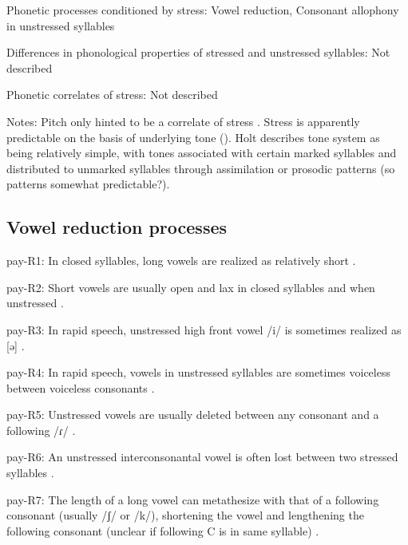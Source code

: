 {\begin{appendixdesc}
\item[Phonetic processes conditioned by stress:] Vowel reduction, Consonant allophony in unstressed syllables

\item[Differences in phonological properties of stressed and unstressed syllables:] Not described

\item[Phonetic correlates of stress:] Not described

\item[Notes:] Pitch only hinted to be a correlate of stress \citep[238]{Holt1986}. Stress is apparently predictable on the basis of underlying tone (\citeyear[19]{Holt1999}). Holt describes tone system as being relatively simple, with tones associated with certain marked syllables and distributed to unmarked syllables through assimilation or prosodic patterns (so patterns somewhat predictable?).
\end{appendixdesc}
\subsection*{Vowel reduction processes}
\begin{appendixdesc}

\item[pay-R1:] In closed syllables, long vowels are realized as relatively short \citep[18]{Holt1999}.

\item[pay-R2:] Short vowels are usually open and lax in closed syllables and when unstressed \citep[18]{Holt1999}.

\item[pay-R3:] In rapid speech, unstressed high front vowel /i/ is sometimes realized as [ə] \citep[18]{Holt1999}.

\item[pay-R4:] In rapid speech, vowels in unstressed syllables are sometimes voiceless between voiceless consonants \citep[18]{Holt1999}.

\item[pay-R5:] Unstressed vowels are usually deleted between any consonant and a following /ɾ/ \citep[23]{Holt1999}.

\item[pay-R6:] An unstressed interconsonantal vowel is often lost between two stressed syllables \citep[23]{Holt1999}.

\item[pay-R7:] The length of a long vowel can metathesize with that of a following consonant (usually /ʃ/ or /k/), shortening the vowel and lengthening the following consonant (unclear if following C is in same syllable) \citep[24--25]{Holt1999}.
\end{appendixdesc}
}
